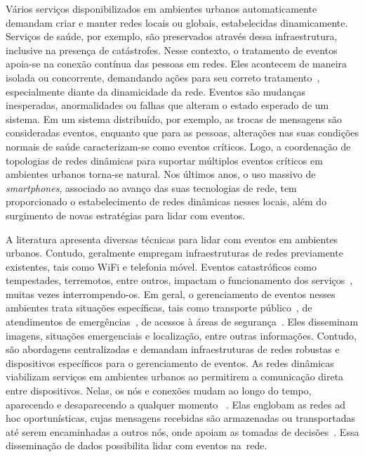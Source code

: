 \documentclass[12pt]{article}
\begin{document}

Vários serviços disponibilizados em ambientes urbanos automaticamente demandam criar e manter redes locais ou globais, estabelecidas dinamicamente.
Serviços de saúde, por exemplo, são preservados através dessa infraestrutura, inclusive na presença de catástrofes. Nesse contexto, o tratamento de
eventos
apoia-se
na
conexão contínua das pessoas em redes. Eles acontecem de maneira isolada ou concorrente, demandando ações para seu correto tratamento~\cite{baldoni2011data}, especialmente diante da dinamicidade da rede.
Eventos são
mudanças inesperadas, anormalidades ou falhas que alteram o estado esperado de um sistema.
Em um sistema distribuído, por exemplo, as trocas de mensagens são consideradas eventos, enquanto que
para as pessoas, alterações nas suas condições normais de saúde caracterizam-se como eventos críticos. 
Logo, a coordenação de topologias de redes dinâmicas para suportar múltiplos eventos críticos em ambientes urbanos torna-se natural. Nos últimos anos, o uso massivo de \textit{smartphones}, associado ao avanço das suas tecnologias de rede, tem proporcionado o estabelecimento de redes dinâmicas nesses locais, além do
surgimento de novas estratégias para lidar com eventos.


A literatura apresenta diversas técnicas para lidar com eventos em ambientes urbanos. Contudo, geralmente empregam infraestruturas de redes previamente existentes, tais como WiFi e telefonia móvel. Eventos catastróficos como tempestades, terremotos, entre outros, impactam o funcionamento dos serviços~\cite{timashev2017resilient}, muitas vezes interrompendo-os. Em geral, o gerenciamento de eventos nesses ambientes trata
situações específicas, tais como
transporte público~\cite{kolios2016data}, de atendimentos de emergências~\cite{rivero2018secure}, de acessos à áreas de segurança~\cite{india2015}. Eles disseminam imagens, situações emergenciais e localização, entre outras informações. Contudo, são abordagens centralizadas e demandam infraestruturas de redes robustas e dispositivos específicos para o gerenciamento de eventos. 
%
As redes dinâmicas
viabilizam
serviços em ambientes urbanos ao permitirem a comunicação direta entre dispositivos. Nelas, os nós e conexões mudam ao longo do tempo, aparecendo e desaparecendo a qualquer momento
~\cite{marquez2019overlapping}. Elas englobam as redes ad hoc
oportunísticas, cujas 
mensagens recebidas são armazenadas ou transportadas até serem encaminhadas a outros nós, 
onde apoiam as
tomadas de decisões~\cite{borrego2019efficient}. Essa disseminação de dados possibilita lidar com eventos
na~rede.
\end{document}
